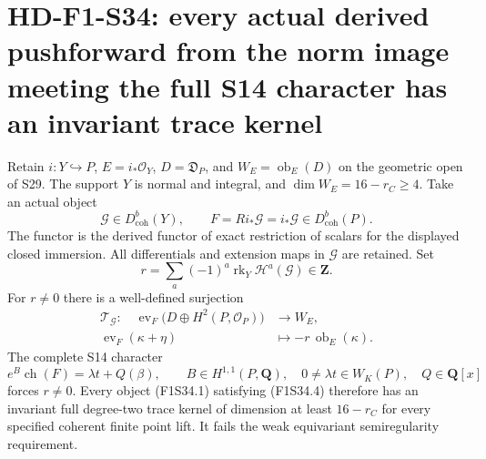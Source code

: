 \section[HD-F1-S34: actual derived objects on the norm image]{HD-F1-S34: every actual derived pushforward from the norm image meeting the full S14 character has an invariant trace kernel}
\label{sec:f1-norm-fourfold-derived-support}

Retain $i:Y\hookrightarrow P$, $E=i_*\mathcal O_Y$,
$D=\mathfrak D_P$, and $W_E=\operatorname{ob}_E(D)$
on the geometric open of S29. The support $Y$ is
normal and integral, and $\dim W_E=16-r_C\ge4$.
Take an actual object
\[
 \mathcal G\in D^b_{\mathrm{coh}}(Y),\qquad
 F=Ri_*\mathcal G=i_*\mathcal G
                       \in D^b_{\mathrm{coh}}(P).
 \tag{F1S34.1}
\]
The functor is the derived functor of exact
restriction of scalars for the displayed closed
immersion. All differentials and extension maps
in $\mathcal G$ are retained.
Set
\[
 r=\sum_a(-1)^a\operatorname{rk}_Y
                         \mathcal H^a(\mathcal G)\in\mathbf Z.
 \tag{F1S34.2}
\]
For $r\ne0$ there is a well-defined surjection
\[
\begin{split}
 \mathcal T_{\mathcal G}:\quad
 \operatorname{ev}_F
       \bigl(D\oplus H^2(P,\mathcal O_P)\bigr)&\longrightarrow W_E,\\
 \operatorname{ev}_F(\kappa+\eta)&\longmapsto
                                  -r\,\operatorname{ob}_E(\kappa).
\end{split}
 \tag{F1S34.3}
\]
The complete S14 character
\[
 e^B\operatorname{ch}(F)=\lambda t+Q(\beta),\qquad
 B\in H^{1,1}(P,\mathbf Q),\quad
 0\ne\lambda t\in W_K(P),\quad Q\in\mathbf Q[x]
 \tag{F1S34.4}
\]
forces $r\ne0$. Every object (F1S34.1) satisfying
(F1S34.4) therefore has an invariant full
degree-two trace kernel of dimension at least
$16-r_C$ for every specified coherent finite
point lift. It fails the weak equivariant
semiregularity requirement.

